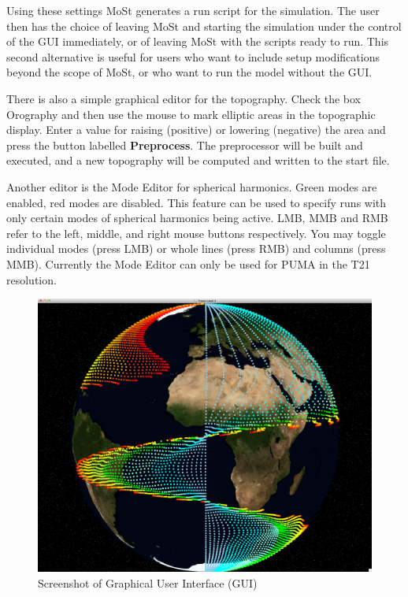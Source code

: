 Using these settings
MoSt generates a run script for the simulation.
The user then has the choice of leaving MoSt and
starting the simulation under the control of the GUI
immediately, or of leaving MoSt with the scripts ready
to run. This second alternative is useful for users who
want to include setup modifications beyond the scope of MoSt,
or who want to run the model without the GUI.

There is also a simple graphical editor for the topography.
Check the box Orography and then use the mouse to mark
elliptic areas in the topographic display.
Enter a value for raising (positive) or lowering (negative) the area
and press the button labelled {\bf Preprocess}.
The preprocessor will be built and executed, and a new
topography will be computed and written to the start file.

Another editor is the Mode Editor for spherical harmonics.
Green modes are enabled, red modes are disabled.
This feature can be used to specify runs with only certain
modes of spherical harmonics being active.
LMB, MMB and RMB refer to the left, middle, and right mouse
buttons respectively. You may toggle individual modes (press LMB)
or whole lines (press RMB) and columns (press MMB). 
Currently the Mode Editor can only be used
for PUMA in the T21 resolution.

\begin{figure}
   \centering
   \includegraphics[width=14cm]{Pics/guisnap}
   \caption[]{Screenshot of Graphical User Interface (GUI)}
   \label{guisnap}
\end{figure}

